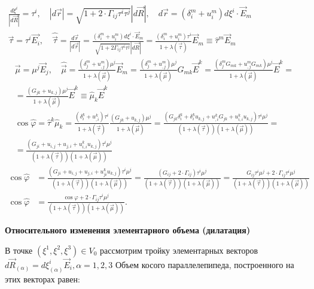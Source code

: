 $
\begin{gathered}
\frac{d \xi^i}{|d \vec{R}|}=\tau^i, \quad|d \vec{r}|=\sqrt{1+2 \cdot \Gamma_{i j} \tau^i \tau^j}|d \vec{R}|, \quad d \vec{r}=\left(\delta_i^m+u_i^m\right) d \xi^i \cdot \vec{E}_m \\
\vec{\tau}=\tau^i \overrightarrow{E_i}, \quad \hat{\vec{\tau}}=\frac{d \vec{r}}{|d \vec{r}|}=\frac{\left(\delta_i^m+u_i^m\right) d \xi^i \cdot \vec{E}_m}{\sqrt{1+2 \Gamma_{i j} \tau^i \tau^j}|d \vec{R}|}=\frac{\left(\delta_i^m+u_i^m\right) \tau^i}{1+\lambda(\vec{\tau})} \vec{E}_m \equiv \hat{\tau}^m \vec{E}_m
\end{gathered}
$
$
\begin{aligned}
& \vec{\mu}=\mu^j \vec{E}_j, \quad \hat{\vec{\mu}}=\frac{\left(\delta_j^m+u_{, j}^m\right) \mu^j}{1+\lambda(\vec{\mu})} \vec{E}_m=\frac{\left(\delta_j^m+u_{, j}^m\right) \mu^j}{1+\lambda(\vec{\mu})} G_{m k} \vec{E}^k=\frac{\left(\delta_j^m G_{m k}+u_{, j}^m G_{m k}\right) \mu^j}{1+\lambda(\vec{\mu})} \vec{E}^k=\\
& =\frac{\left(G_{j k}+u_{k, j}\right) \mu^j}{1+\lambda(\vec{\mu})} \vec{E}^k \equiv \hat{\mu}_k \vec{E}^k \\
& \cos \hat{\varphi}=\hat{\tau}^k \hat{\mu}_k=\frac{\left(\delta_i^k+u_{, i}^k\right) \tau^i}{1+\lambda(\vec{\tau})} \frac{\left(G_{j k}+u_{k, j}\right) \mu^j}{1+\lambda(\vec{\mu})}=\frac{\left(G_{j k} \delta_i^k+\delta_i^k u_{k, j}+u_{, i}^k G_{j k}+u_{i, i}^k u_{k, j}\right) \tau^i \mu^j}{(1+\lambda(\vec{\tau}))(1+\lambda(\vec{\mu}))}=\\
& =\frac{\left(G_{j i}+u_{i, j}+u_{j, i}+u_{i, i}^k u_{k, j}\right) \tau^i \mu^j}{(1+\lambda(\vec{\tau}))(1+\lambda(\vec{\mu}))}
\end{aligned}
$
$\begin{aligned} \cos \hat{\varphi} & =\frac{\left(G_{j i}+u_{i, j}+u_{j, i}+u_{j i}^k u_{k, j}\right) \tau^i \mu^j}{(1+\lambda(\vec{\tau}))(1+\lambda(\vec{\mu}))}=\frac{\left(G_{i j}+2 \cdot \Gamma_{i j}\right) \tau^i \mu^j}{(1+\lambda(\vec{\tau}))(1+\lambda(\vec{\mu}))} =\frac{G_{i j} \tau^i \mu^j+2 \cdot \Gamma_{i j} \tau^i \mu^j}{(1+\lambda(\vec{\tau}))(1+\lambda(\vec{\mu}))} \\ \cos \hat{\varphi} & =\frac{\cos \varphi+2 \cdot \Gamma_{i j} \tau^i \mu^j}{(1+\lambda(\vec{\tau}))(1+\lambda(\vec{\mu}))}.\end{aligned}$


\textbf{Относительного изменения элементарного объема (дилатация)}


В точке $\left(\xi^1, \xi^2, \xi^3\right) \in V_0$ рассмотрим тройку элементарных векторов $d \vec{R}_{(\alpha)}=d \xi_{(\alpha)}^i \vec{E}_i, \alpha=1,2,3$ Объем косого параллелепипеда, построенного на этих векторах равен: 

